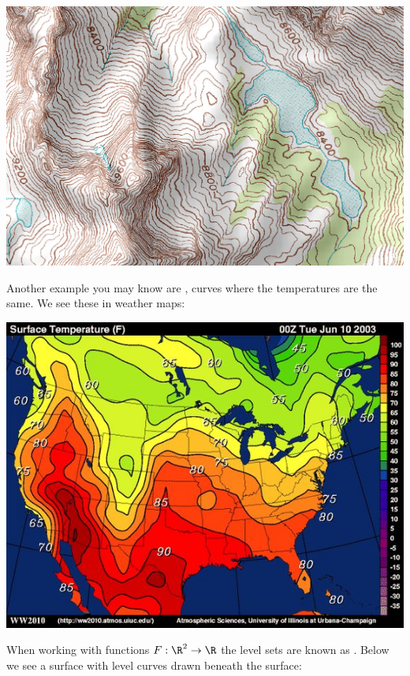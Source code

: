 \documentclass{ximera}
\begin{document}
\begin{image}%
  \includegraphics{topomap.jpg}
\end{image}


Another example you may know are , curves where the
temperatures are the same. We see these in weather maps:

\begin{image}
  \includegraphics{isotherm.jpg}
\end{image}

When working with functions $F:\R^2\to\R$ the level sets are known as
.  Below we see a surface with level curves drawn
beneath the surface:
\end{document}

